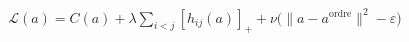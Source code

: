 \documentclass[preview]{standalone}
\begin{document}
\begin{align*}
\mathcal{L}(a)= C(a) +\lambda\sum_{i<j} [h_{ij}(a)]_+ +\nu\big(\|a-a^{\mathrm{ordre}}\|^2-\varepsilon\big)
\end{align*}
\end{document}
